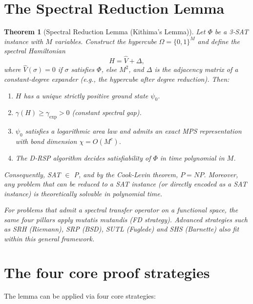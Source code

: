 \documentclass[11pt,a4paper]{article}
\newtheorem{theorem}{Theorem}[section]
\begin{document}
\section{The Spectral Reduction Lemma}

\begin{theorem}[Spectral Reduction Lemma (Kithima’s Lemma)]
Let \(\Phi\) be a 3‑SAT instance with \(M\) variables. Construct the hypercube \(\Omega = \{0,1\}^{M}\) and define the spectral Hamiltonian
\[
H = \hat{V} +\Delta,
\]
where \(\hat{V}(\sigma) = 0\) if \(\sigma\) satisfies \(\Phi\), else \(M^{2}\), and \(\Delta\) is the adjacency matrix of a constant‑degree expander (e.g., the hypercube after degree reduction). Then:
\begin{enumerate}
\item \(H\) has a unique strictly positive ground state \(\psi_0\).
\item \(\gamma(H)\geq \gamma_{\mathrm{exp}} > 0\) (constant spectral gap).
\item \(\psi_0\) satisfies a logarithmic area law and admits an exact MPS representation with bond dimension \(\chi = O(M^{c})\).
\item The D‑RSP algorithm decides satisfiability of \(\Phi\) in time polynomial in \(M\).
\end{enumerate}
Consequently, SAT \(\in\) P, and by the Cook‑Levin theorem, \(P = NP\). Moreover, any problem that can be reduced to a SAT instance (or directly encoded as a SAT instance) is theoretically solvable in polynomial time.

For problems that admit a spectral transfer operator on a functional space, the same four pillars apply mutatis mutandis (FD strategy). Advanced strategies such as SRH (Riemann), SRP (BSD), SUTL (Fuglede) and SHS (Barnette) also fit within this general framework.
\end{theorem}

\section{The four core proof strategies}

The lemma can be applied via four core strategies:
\end{document}
